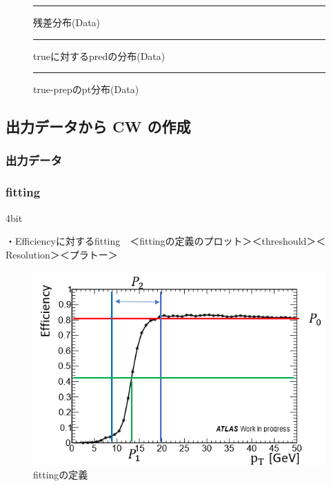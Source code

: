\begin{figure}[tb]
  \centering
  \rule{8cm}{6cm}
  \caption{残差分布(Data)}
  \label{fig:fit_def}
\end{figure}

\begin{figure}[tb]
  \centering
  \rule{8cm}{6cm}
  \caption{trueに対するpredの分布(Data)}
  \label{fig:fit_def}
\end{figure}

\begin{figure}[tb]
  \centering
  \rule{8cm}{6cm}
  \caption{true-prepのpt分布(Data)}
  \label{fig:fit_def}
\end{figure}


\subsection{出力データから CW の作成}
\subsubsection{出力データ}
\subsubsection{fitting}


4bit


・Efficiencyに対するfitting　＜fittingの定義のプロット＞＜threshould＞＜Resolution＞＜プラトー＞\\
\begin{figure}[tb]
  \centering
  \includegraphics[clip, width=14cm]{fig/4/fitting_def.png}
  \caption{fittingの定義}
  \label{fig:fit_def}
\end{figure}

